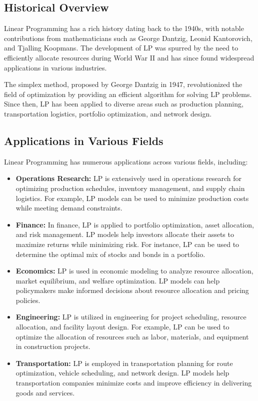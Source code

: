 \documentclass[12pt]{book} %
\begin{document}
\subsection{Historical Overview}

Linear Programming has a rich history dating back to the 1940s, with notable contributions from mathematicians such as George Dantzig, Leonid Kantorovich, and Tjalling Koopmans. The development of LP was spurred by the need to efficiently allocate resources during World War II and has since found widespread applications in various industries.

The simplex method, proposed by George Dantzig in 1947, revolutionized the field of optimization by providing an efficient algorithm for solving LP problems. Since then, LP has been applied to diverse areas such as production planning, transportation logistics, portfolio optimization, and network design.

\subsection{Applications in Various Fields}

Linear Programming has numerous applications across various fields, including:

\begin{itemize}
    \item \textbf{Operations Research:} LP is extensively used in operations research for optimizing production schedules, inventory management, and supply chain logistics. For example, LP models can be used to minimize production costs while meeting demand constraints.
    
    \item \textbf{Finance:} In finance, LP is applied to portfolio optimization, asset allocation, and risk management. LP models help investors allocate their assets to maximize returns while minimizing risk. For instance, LP can be used to determine the optimal mix of stocks and bonds in a portfolio.
    
    \item \textbf{Economics:} LP is used in economic modeling to analyze resource allocation, market equilibrium, and welfare optimization. LP models can help policymakers make informed decisions about resource allocation and pricing policies.
    
    \item \textbf{Engineering:} LP is utilized in engineering for project scheduling, resource allocation, and facility layout design. For example, LP can be used to optimize the allocation of resources such as labor, materials, and equipment in construction projects.
    
    \item \textbf{Transportation:} LP is employed in transportation planning for route optimization, vehicle scheduling, and network design. LP models help transportation companies minimize costs and improve efficiency in delivering goods and services.
\end{itemize}
\end{document}
